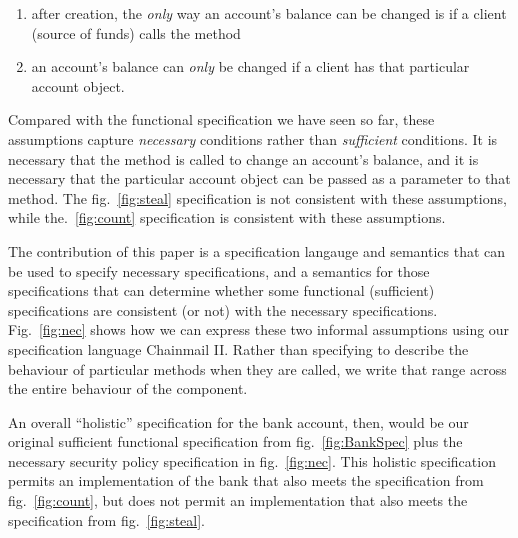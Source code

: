 \begin{enumerate}
\item after creation, the \emph{only} way an account's
  balance can be changed is if a client (source of funds) calls the  method 
\item an account's balance can \emph{only} be changed if a client has
  that particular account object.
\end{enumerate}

Compared with the functional specification we have seen so far, these
assumptions capture \emph{necessary} conditions rather than
\emph{sufficient} conditions. It is necessary that the 
method is called to change an account's balance, and it is necessary
that the particular account object can be passed as a parameter to
that method. The fig.~\ref{fig:steal} specification is not consistent
with these assumptions, while the.~\ref{fig:count} specification is
consistent with these assumptions.

The contribution of this paper is a specification langauge and
semantics that can be used to specify necessary specifications, and a
semantics for those specifications that can determine whether some
functional (sufficient) specifications are consistent (or not) with
the necessary specifications. Fig.~\ref{fig:nec} shows how we
can express these two informal assumptions using our specification
language Chainmail II.  Rather than specifying  to
describe the behaviour of particular methods when they are called, we
write  that range across the entire behaviour of the
component.


An overall ``holistic'' specification for the bank account, then,
would be our original sufficient functional specification from
fig.~\ref{fig:BankSpec} plus the necessary security policy
specification in fig.~\ref{fig:nec}.  This holistic specification
permits an implementation of the bank that also meets the 
specification from fig.~\ref{fig:count}, but does not permit an
implementation that also meets the  specification from
fig.~\ref{fig:steal}.


